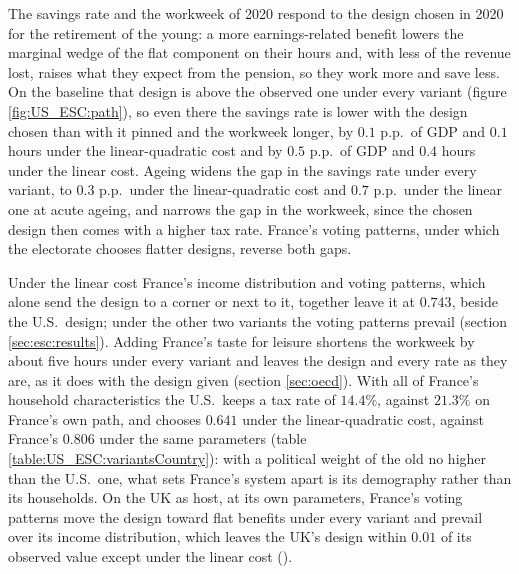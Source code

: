 

The savings rate and the workweek of 2020 respond to the design chosen in 2020 for the retirement of the young: a more earnings-related benefit lowers the marginal wedge of the flat component on their hours and, with less of the revenue lost, raises what they expect from the pension, so they work more and save less. On the baseline that design is above the observed one under every variant (figure \ref{fig:US_ESC:path}), so even there the savings rate is lower with the design chosen than with it pinned and the workweek longer, by $0.1$ p.p.\ of GDP and $0.1$ hours under the linear-quadratic cost and by $0.5$ p.p.\ of GDP and $0.4$ hours under the linear cost. Ageing widens the gap in the savings rate under every variant, to $0.3$ p.p.\ under the linear-quadratic cost and $0.7$ p.p.\ under the linear one at acute ageing, and narrows the gap in the workweek, since the chosen design then comes with a higher tax rate. France's voting patterns, under which the electorate chooses flatter designs, reverse both gaps.

Under the linear cost France's income distribution and voting patterns, which alone send the design to a corner or next to it, together leave it at $0.743$, beside the U.S.\ design; under the other two variants the voting patterns prevail (section \ref{sec:esc:results}). Adding France's taste for leisure shortens the workweek by about five hours under every variant and leaves the design and every rate as they are, as it does with the design given (section \ref{sec:oecd}). With all of France's household characteristics the U.S.\ keeps a tax rate of $14.4\%$, against $21.3\%$ on France's own path, and chooses $0.641$ under the linear-quadratic cost, against France's $0.806$ under the same parameters (table \ref{table:US_ESC:variantsCountry}): with a political weight of the old no higher than the U.S.\ one, what sets France's system apart is its demography rather than its households. On the UK as host, at its own parameters, France's voting patterns move the design toward flat benefits under every variant and prevail over its income distribution, which leaves the UK's design within $0.01$ of its observed value except under the linear cost ().

\FloatBarrier

